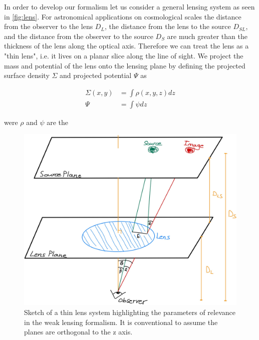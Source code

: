 \par In order to develop our formalism let us consider a general lensing system as seen in \autoref{fig:lens}. For astronomical applications on cosmological scales the distance from the observer to the lens $D_L$, the distance from the lens to the source $D_{SL}$, and the distance from the observer to the source $D_S$ are much greater than the thickness of the lens along the optical axis. Therefore we can treat the lens as a "thin lens", i.e. it lives on a planar slice along the line of sight. We project the mass and potential of the lens onto the lensing plane by defining the projected surface density $\Sigma$ and projected potential $\Psi$ as

\begin{equation}
  \begin{split}
    \Sigma(x,y) &= \int \rho(x,y,z) dz \\
    \Psi &= \int \psi dz
  \end{split}
  \label{eq:surfacedensity+surfacepot}
\end{equation}

were $\rho$ and $\psi$ are the

\begin{figure}
    \begin{center}
      \includegraphics[width=\textwidth]{figs/lens.jpg}
    \end{center}
    \caption{Sketch of a thin lens system highlighting the parameters of relevance in the weak lensing formalism. It is conventional to assume the planes are orthogonal to the z axis.}
    \label{fig:lens}
\end{figure}

